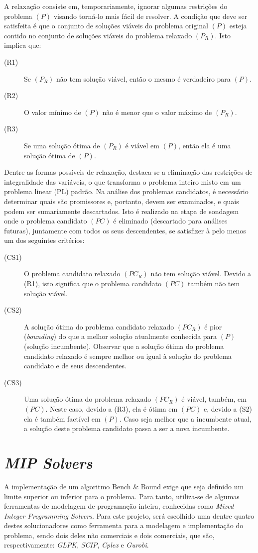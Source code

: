 \documentclass[a4paper,10pt]{article}
\newcommand{\fw}[1]{\emph{#1}}
\begin{document}
A relaxação consiste em, temporariamente, ignorar algumas restrições do problema $(P)$ visando torná-lo
mais fácil de resolver. A condição que deve ser satisfeita é que o conjunto de soluções viáveis do problema
original $(P)$ esteja contido no conjunto de soluções viáveis do problema relaxado $(P_R)$. Isto implica que:

\begin{description}
  \item[(R1)] Se $(P_R)$ não tem solução viável, então o mesmo é verdadeiro para $(P)$.
  \item[(R2)] O valor mínimo de $(P)$ não é menor que o valor máximo de $(P_R)$.
  \item[(R3)] Se uma solução ótima de $(P_R)$ é viável em $(P)$, então ela é uma solução ótima de $(P)$. 
\end{description}

Dentre as formas possíveis de relaxação, destaca-se a eliminação das restrições de integralidade das
variáveis, o que transforma o problema inteiro misto em um problema linear (PL) padrão.
Na análise dos problemas candidatos, é necessário determinar quais são promissores e, portanto, devem ser
examinados, e quais podem ser sumariamente descartados. Isto é realizado na etapa de sondagem onde o
problema candidato $(PC)$ é eliminado (descartado para análises futuras), juntamente com todos os seus
descendentes, se satisfizer à pelo menos um dos seguintes critérios:

\begin{description}
  \item [(CS1)] O problema candidato relaxado $(PC_R)$ não tem solução viável. Devido a (R1), isto significa que
o problema candidato $(PC)$ também não tem solução viável.
  \item [(CS2)] A solução ótima do problema candidato relaxado $(PC_R)$ é pior (\fw{bounding}) do que a melhor
solução atualmente conhecida para $(P)$ (solução incumbente). Observar que a solução ótima do
problema candidato relaxado é sempre melhor ou igual à solução do problema candidato e de seus
descendentes.
  \item [(CS3)] Uma solução ótima do problema relaxado $(PC_R)$ é viável, também, em $(PC)$. Neste caso, devido
a (R3), ela é ótima em $(PC)$ e, devido a (S2) ela é também factível em $(P)$. Caso seja melhor que a
incumbente atual, a solução deste problema candidato passa a ser a nova incumbente. 
\end{description}

\section{\fw{MIP Solvers}}
\label{solvers}
A implementação de um algoritmo Bench \& Bound exige que seja definido um limite
superior ou inferior para o problema. Para tanto, utiliza-se de algumas
ferramentas de modelagem de programação inteira, conhecidas como \fw{Mixed
Integer Programming Solvers}. Para este projeto, será escolhido uma dentre
quatro destes solucionadores como ferramenta para a modelagem e implementação do
problema, sendo dois deles não comerciais e dois comerciais, que são,
respectivamente: \fw{GLPK}, \fw{SCIP}, \fw{Cplex} e \fw{Gurobi}.
\end{document}

